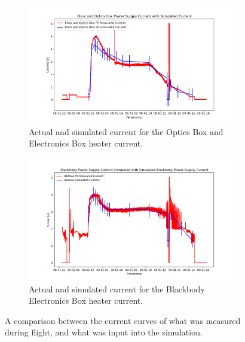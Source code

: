 \begin{figure}
    \centering
    \begin{subfigure}[h]{0.9\textwidth}
        \centering
        \includegraphics[width=\textwidth]{chap4_images/Ebox_OBox_I_sim_and_actual_new.png}
        \caption{Actual and simulated current for the Optics Box and Electronics Box heater current.}
        \label{fig:actual_sim_current_obox_ebox}
    \end{subfigure}
    \begin{subfigure}[h]{0.9\textwidth}
        \centering
        \includegraphics[width=\textwidth]{chap4_images/BBEbox_I_sim_and_actual_new.png}
        \caption{Actual and simulated current for the Blackbody Electronics Box heater current.}
        \label{fig:actual_sim_current_bbebox}
    \end{subfigure}
    \caption{A comparison between the current curves of what was measured during flight, and what was input into the simulation.}
    \label{fig:actual_sim_current}
\end{figure}

